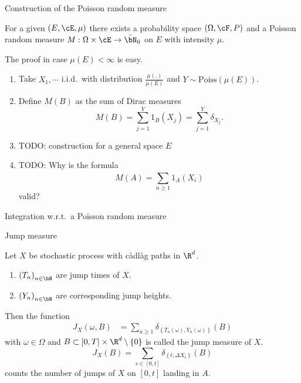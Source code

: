 \begin{frame}
    {Construction of the Poisson random measure}
    
    \begin{theorem}
        For a given $(E,\cE, \mu)$ there exists a probability space $(\Omega,\cF,P)$ and
        a Poisson random measure $M:\Omega \times \cE \to \bar \bN_0$ on $E$ 
        with intensity $\mu$. 
    \end{theorem}
    
    The proof in case $\mu(E)<\infty$ is easy.
    \begin{enumerate}
        \item Take $X_1, \cdots$ i.i.d.\ with distribution $\frac{\mu(.)}{\mu(E)}$ and
            $Y \sim\text{Poiss}(\mu(E))$. 
        \item Define $M(B)$ as the sum of Dirac measures
            \begin{equation*}
                M(B) = \sum_{j=1}^{Y} 1_{B}(X_j) = \sum_{j=1}^{Y} \delta_{X_j}.
            \end{equation*}
        \item TODO: construction for a general space $E$
        \item TODO: Why is the formula
            \begin{equation*}
                M(A) = \sum_{n\geq 1}^{} 1_{A}(X_i)
            \end{equation*}
            valid?
    \end{enumerate}
\end{frame}

\begin{frame}
    {Integration w.r.t.\ a Poisson random measure}
    
\end{frame}


\begin{frame}
    {Jump measure}
    
    Let $X$ be stochastic process with c\`adl\`ag paths in $\R^d$.

    \begin{enumerate}
        \item $\left( T_n \right)_{n\in \bN}$ are jump times of $X$.
        \item $\left( Y_n \right)_{n\in \bN}$ are corresponding jump heights. 
    \end{enumerate}

    Then the function
    \begin{align*}
        J_{X}\left( \omega, B \right) 
        &= \sum_{n \geq 1}^{} \delta_{\left\{T_n(\omega), Y_n(\omega)\right\}}(B)
    \end{align*}
    with $\omega\in\Omega$ and $B \subset [0,T]\times \R^{d}\setminus \left\{ 0
    \right\}$ is called the jump measure of $X$.
    \begin{equation*}
        J_X (B) 
        = \sum_{s\in [0,t]} \delta_{ \left\{ t, \Delta X_t \right\}} (B) 
    \end{equation*}
    counts the number of jumps of $X$ on $[0,t]$ landing in $A$. 

\end{frame}

